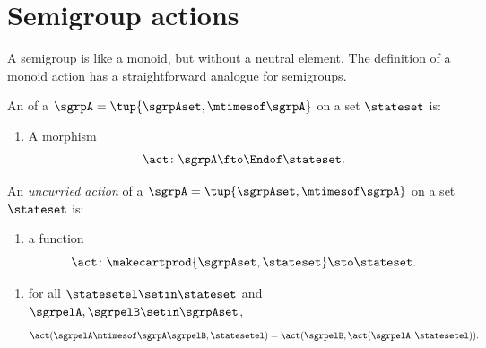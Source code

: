 
\section{Semigroup actions}
\label{sec:semigroup-actions}

A semigroup is like a monoid, but without a neutral element. The definition of a monoid action has a straightforward analogue for semigroups. 



\begin{ctdefinition}
    \label{def:semigroup-cov-action}
    An  of a  $\sgrpA = \tup{\sgrpAset, \mtimesof\sgrpA}$ on a set $\stateset$ is:

    \constit
    \begin{enumerate}
        \item A  morphism
              \begin{equation}
                  \label{eq:act-semigroup}
                  \act \colon \sgrpA \fto \Endof\stateset.
              \end{equation}
    \end{enumerate}
\end{ctdefinition}

\begin{ctdefinition}
    \label{def:semigroup-uncurried-action}
    An \emph{uncurried action} of a  $\sgrpA = \tup{\sgrpAset, \mtimesof\sgrpA}$ on a set $\stateset$ is:

    \constit
    \begin{enumerate}
        \item a function
              \begin{equation}
                  \label{eq:semigroup-uncurried-action}
                  \act \colon \makecartprod{\sgrpAset, \stateset} \sto \stateset.
              \end{equation}
    \end{enumerate}
    \condit
    \begin{enumerate}
        \item for all $\statesetel \setin \stateset$ and $\sgrpelA, \sgrpelB \setin \sgrpAset$,
              \begin{equation}
                  \label{eq:semigroup-uncurried-action-1cond}
                  \act(\sgrpelA \mtimesof\sgrpA \sgrpelB, \statesetel) = \act(\sgrpelB, \act(\sgrpelA, \statesetel)).
              \end{equation}
    \end{enumerate}
\end{ctdefinition}

